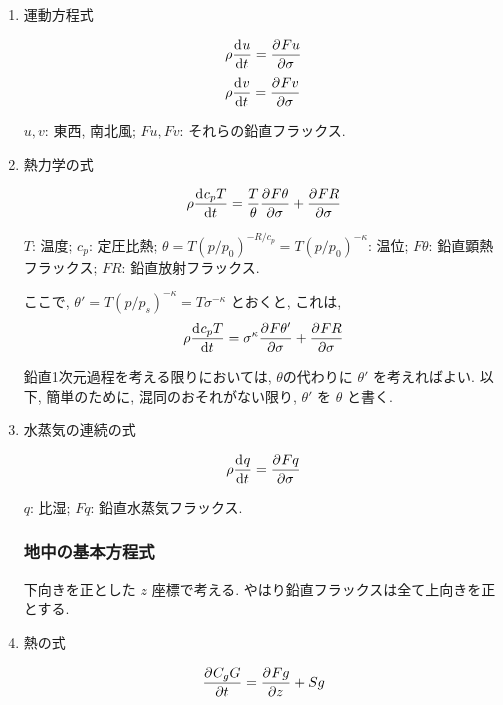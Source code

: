 \begin{enumerate}
\item 運動方程式

\begin{equation}
  \rho \DD{u}{t} = \DP{Fu}{\sigma}
\label{u-eq.orig}
\end{equation}
\begin{equation}
  \rho \DD{v}{t} = \DP{Fv}{\sigma}
\end{equation}

$u, v$: 東西, 南北風; 
$Fu, Fv$: それらの鉛直フラックス.

\item 熱力学の式

\begin{equation}
  \rho \DD{c_p T}{t} = \frac{T}{\theta} \DP{F{\theta}}{\sigma} 
                     + \DP{F{R}}{\sigma} 
\end{equation}

$T$: 温度; 
$c_p$: 定圧比熱; 
$\theta=T(p/p_0)^{-R/c_p}=T(p/p_0)^{-\kappa}$: 温位;
$F\theta$: 鉛直顕熱フラックス;
$FR$: 鉛直放射フラックス.

ここで, $\theta'=T(p/p_s)^{-\kappa}=T\sigma^{-\kappa}$ とおくと, これは,
\begin{equation}
  \rho \DD{c_p T}{t} = \sigma^\kappa \DP{F{\theta'}}{\sigma} 
                     + \DP{F{R}}{\sigma} 
\end{equation}

鉛直1次元過程を考える限りにおいては,
$\theta$の代わりに $\theta'$ を考えればよい.
以下, 簡単のために, 混同のおそれがない限り,
$\theta'$ を $\theta$ と書く.

\item 水蒸気の連続の式

\begin{equation}
  \rho \DD{q}{t} = \DP{Fq}{\sigma} 
\end{equation}

$q$: 比湿; 
$F{q}$: 鉛直水蒸気フラックス.

\subsubsection{地中の基本方程式}

下向きを正とした $z$ 座標で考える. 
やはり鉛直フラックスは全て上向きを正とする.

\item 熱の式

\begin{equation}
  \DP{C_g G}{t} = \DP{Fg}{z} + Sg
\end{equation}


\end{enumerate}

